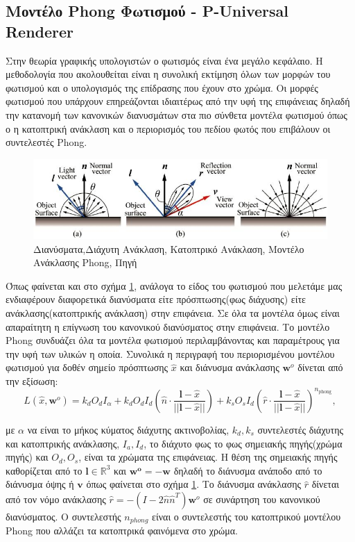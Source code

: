 \begin{appendices}
    \subsection*{Μοντέλο Phong Φωτισμού - P-Universal Renderer}
    \label{appendix:phong}
    Στην θεωρία γραφικής υπολογιστών ο φωτισμός είναι ένα μεγάλο κεφάλαιο. Η μεθοδολογία που ακολουθείται είναι η συνολική εκτίμηση όλων των μορφών του φωτισμού και ο υπολογισμός της επίδρασης που έχουν στο χρώμα. Οι μορφές φωτισμού που υπάρχουν επηρεάζονται ιδιαιτέρως από την υφή της επιφάνειας δηλαδή την κατανομή των κανονικών διανυσμάτων στα πιο σύνθετα μοντέλα φωτισμού όπως ο η κατοπτρική ανάκλαση και ο περιορισμός του πεδίου φωτός που επιβάλουν οι συντελεστές Phong.
    \begin{figure}[H]
        \centering
        \includegraphics[width = 0.6\linewidth]{images/chapter2_img/Phong-reflection-model-a-diffuse-b-specular-light.jpg}
        \caption{ Διανύσματα,Διάχυτη Ανάκλαση, Κατοπτρικό Ανάκλαση, Μοντέλο Ανάκλασης Phong, Πηγή \cite{shader-hologram}}
        \label{fig:PhongReflectionmodel}
    \end{figure}
    Όπως φαίνεται και στο σχήμα \ref{fig:PhongReflectionmodel}, ανάλογα το είδος του φωτισμού που μελετάμε μας ενδιαφέρουν διαφορετικά διανύσματα είτε πρόσπτωσης(φως διάχυσης) είτε ανάκλασης(κατοπτρικής ανάκλαση) στην επιφάνεια. Σε όλα τα μοντέλα όμως είναι απαραίτητη η επίγνωση του κανονικού διανύσματος στην επιφάνεια. Το μοντέλο Phong συνδυάζει όλα τα μοντέλα φωτισμού  περιλαμβάνοντας και παραμέτρους  για την υφή των υλικών η οποία. Συνολικά η περιγραφή του  περιορισμένου μοντέλου φωτισμού για δοθέν σημείο πρόσπτωσης \(\hat{x}\) και διάνυσμα ανάκλασης \(\boldsymbol{w}^o\) δίνεται από την εξίσωση:
    \begin{equation}        
        L(\hat{x},\boldsymbol{w}^o) = k_{d}O_{d}I_{\alpha} + k_{d}O_{d}I_{d}(\hat{n} \cdot \frac{\boldsymbol{l}- \hat{x}}{||\boldsymbol{l} - \hat{x}||}) + k_{s}O_{s}I_{d}(\hat{r}\cdot \frac{\boldsymbol{l}- \hat{x}}{||\boldsymbol{l} - \hat{x}||})^{n_{\text{phong}}},
        \label{eq:PhongReflectionModel}
    \end{equation}

    με $\alpha$ να είναι το μήκος κύματος διάχυτης ακτινοβολίας, $k_d, k_s$ συντελεστές διάχυτης και κατοπτρικής ανάκλασης, $I_a,I_d$, το διάχυτο φως το φως σημειακής πηγής(χρώμα πηγής) και $O_d,O_s$, είναι τα χρώματα της επιφάνειας. Η θέση της σημειακής πηγής καθορίζεται από το $\boldsymbol{l} \in \mathbb{R}^3$ και $\boldsymbol{w^o} = -\boldsymbol{w}$ δηλαδή το διάνυσμα ανάποδο από το διάνυσμα όψης ή $\boldsymbol{v}$ όπως φαίνεται στο σχήμα \ref{fig:PhongReflectionmodel}. Το διάνυσμα ανάκλασης \(\hat{r}\) δίνεται από τον νόμο ανάκλασης \(\hat{r} = -(I - 2\hat{n}\hat{n}^T)\boldsymbol{w}^o\) σε συνάρτηση του κανονικού διανύσματος. Ο συντελεστής $n_{phong}$ είναι ο συντελεστής του κατοπτρικού μοντέλου Phong που αλλάζει τα κατοπτρικά φαινόμενα στο χρώμα.


\end{appendices}
